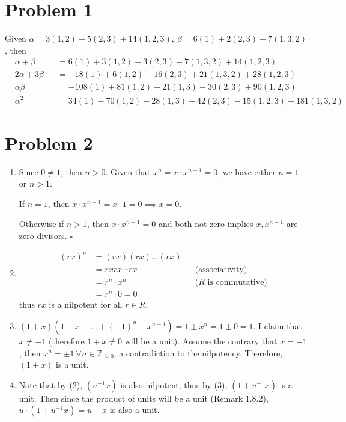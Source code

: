 \documentclass{article}
\title{\mytitle}
\author{\myname}
\date{\today}
\theoremstyle{plain}
\begin{document}
\maketitle
\section*{Problem 1}
Given $\alpha=3(1,2)-5(2,3)+14(1,2,3),\ \beta=6(1)+2(2,3)-7(1,3,2)$, then
\begin{align*}
	 & \alpha+\beta   &  & =6(1)+3(1,2)-3(2,3)-7(1,3,2)+14(1,2,3)              \\
	 & 2\alpha+3\beta &  & =-18(1)+6(1,2)-16(2,3)+21(1,3,2)+28(1,2,3)          \\
	 & \alpha\beta    &  & = -108(1) + 81(1,2) -21(1,3)-30(2,3) + 90(1,2,3)    \\
	 & \alpha^{2}     &  & =34(1)-70(1,2)-28(1,3)+42(2,3)-15(1,2,3)+181(1,3,2)
\end{align*}

\section*{Problem 2}
\begin{enumerate}
	\item Since $0\neq1$, then $n>0$. Given that $x^{n}=x\cdot x^{n-1}=0$, we have either
	      $n=1$ or $n>1$.

	      If $n=1$, then $x\cdot x^{n-1}=x\cdot1=0 \implies x=0$.

	      Otherwise if $n>1$, then $x\cdot x^{n-1}=0$ and both not zero implies
	      $x, x^{n-1}$ are zero divisors. $\square$

	\item \begin{align*}
		      (rx)^{n} & = (rx)(rx)\ldots(rx)                                  \\
		               & = rxrx\cdots rx      &  & \text{(associativity)}      \\
		               & = r^{n}\cdot x^{n}   &  & \text{($R$ is commutative)} \\
		               & = r^{n}\cdot0 = 0
	      \end{align*} thus $rx$ is a nilpotent for all $r\in R$.

	\item $(1+x)(1-x+\ldots+(-1)^{n-1}x^{n-1})=1\pm x^{n}=1\pm0=1$. I claim that $x\neq-1$ (therefore
	      $1+x\neq0$ will be a unit). Assume the contrary that $x=-1$, then
	      $x^{n}=\pm1\ \forall n\in\mathbb{Z}_{>0}$, a contradiction to the nilpotency.
	      Therefore, $(1+x)$ is a unit.

	\item
	      Note that by (2), $(u^{-1}x)$ is also nilpotent, thus by (3),
	      $(1+u^{-1}x)$ is a unit. Then since the product of units will be a unit (Remark 1.8.2), $u\cdot(1+u^{-1}x)=u+x$ is also a unit.
\end{enumerate}
\end{document}
